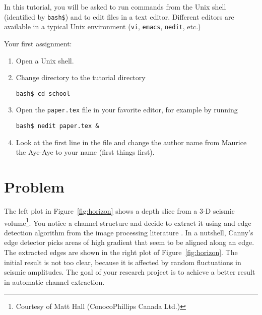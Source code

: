 In this tutorial, you will be asked to run commands from the Unix
shell (identified by \texttt{bash\$}) and to edit files in a text
editor. Different editors are available in a typical Unix environment
(\texttt{vi}, \texttt{emacs}, \texttt{nedit}, etc.)

Your first assignment:
\begin{enumerate}
\item Open a Unix shell.
\item Change directory to the tutorial directory
\begin{verbatim}
bash$ cd school
\end{verbatim}
\item Open the \texttt{paper.tex} file in your favorite editor, for example by
running
\begin{verbatim}
bash$ nedit paper.tex & 
\end{verbatim}
\item Look at the first line in the file and change the author name from Maurice the Aye-Aye to your name (first things first). 
\end{enumerate}

\section{Problem}


The left plot in Figure~\ref{fig:horizon} shows a depth slice from a 3-D
seismic volume\footnote{Courtesy of Matt Hall (ConocoPhillips Canada
Ltd.)}. You notice a channel structure and decide to extract it using
and edge detection algorithm from the image processing literature
\cite[]{canny}. In a nutshell, Canny's edge detector picks areas of
high gradient that seem to be aligned along an edge. The extracted
edges are shown in the right plot of Figure~\ref{fig:horizon}. The initial
result is not too clear, because it is affected by random
fluctuations in seismic amplitudes. The goal of your research project
is to achieve a better result in automatic channel extraction.

